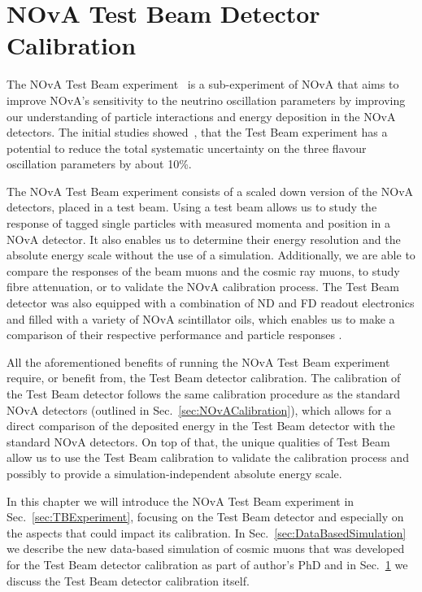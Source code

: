 \chapter{NOvA Test Beam Detector Calibration}\label{sec:TestBeamCalibration}

The \gls{NOvA} Test Beam experiment~\cite{NOvATestBeamWallbangProceedings2020.pdf} is a sub-experiment of \gls{NOvA} that aims to improve \gls{NOvA}'s sensitivity to the neutrino oscillation parameters by improving our understanding of particle interactions and energy deposition in the \gls{NOvA} detectors. The initial studies showed~\cite{NOvA-doc-33012}, that the Test Beam experiment has a potential to reduce the total systematic uncertainty on the three flavour oscillation parameters by about 10\%.
 
The \gls{NOvA} Test Beam experiment consists of a scaled down version of the \gls{NOvA} detectors, placed in a test beam. Using a test beam allows us to study the response of tagged single particles with measured momenta and position in a \gls{NOvA} detector. It also enables us to determine their energy resolution and the absolute energy scale without the use of a simulation. Additionally, we are able to compare the responses of the beam muons and the cosmic ray muons, to study fibre attenuation, or to validate the \gls{NOvA} calibration process. The Test Beam detector was also equipped with a combination of \gls{ND} and \gls{FD} readout electronics and filled with a variety of \gls{NOvA} scintillator oils, which enables us to make a comparison of their respective performance and particle responses \cite{NOvA-doc-15750}.

All the aforementioned benefits of running the \gls{NOvA} Test Beam experiment require, or benefit from, the Test Beam detector calibration. The calibration of the Test Beam detector follows the same calibration procedure as the standard \gls{NOvA} detectors (outlined in Sec.~\ref{sec:NOvACalibration}), which allows for a direct comparison of the deposited energy in the Test Beam detector with the standard \gls{NOvA} detectors. On top of that, the unique qualities of Test Beam allow us to use the Test Beam calibration to validate the calibration process and possibly to provide a simulation-independent absolute energy scale.

In this chapter we will introduce the \gls{NOvA} Test Beam experiment in Sec.~\ref{sec:TBExperiment}, focusing on the Test Beam detector and especially on the aspects that could impact its calibration. In Sec.~\ref{sec:DataBasedSimulation} we describe the new data-based simulation of cosmic muons that was developed for the Test Beam detector calibration as part of author's PhD and in Sec.~\ref{sec:TestBeamCalibration} we discuss the Test Beam detector calibration itself. 

